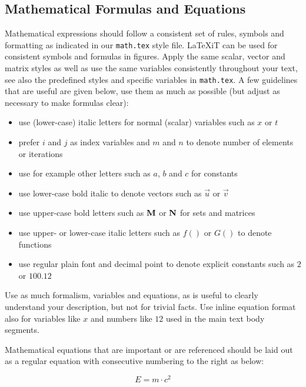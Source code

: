 \documentclass[11pt, a4paper,oneside,chapterprefix=false]{scrbook}
\begin{document}
\subsection*{Mathematical Formulas and Equations}

Mathematical expressions should follow a consistent set of rules, symbols and formatting as indicated in our \texttt{math.tex} style file. LaTeXiT can be used for consistent symbols and formulas in figures. Apply the same scalar, vector and matrix styles as well as use the same variables consistently throughout your text, see also the predefined styles and specific variables in \texttt{math.tex}. A few guidelines that are useful are given below, use them as much as possible (but adjust as necessary to make formulas clear):

\begin{itemize}
\item use (lower-case) italic letters for normal (scalar) variables such as $x$ or $t$
\item prefer $i$ and $j$ as index variables and $m$ and $n$ to denote number of elements or iterations
\item use for example other letters such as $a$, $b$ and $c$ for constants
\item use lower-case bold italic to denote vectors such as $\vec{u}$ or $\vec{v}$
\item use upper-case bold letters such as $\mathbf{M}$ or $\mathbf{N}$ for sets and matrices
\item use upper- or lower-case italic letters such as $f()$ or $G()$ to denote functions
\item use regular plain font and decimal point to denote explicit constants such as $2$ or $100.12$
\end{itemize}

Use as much formalism, variables and equations, as is useful to clearly understand your description, but not for trivial facts. Use inline equation format also for variables like $x$ and numbers like $12$ used in the main text body segments.

Mathematical equations that are important or are referenced should be laid out as a  regular equation with consecutive numbering to the right as below:

\begin{equation}
E = m \cdot c^2
\label{eq:einstein}
\end{equation}
\end{document}
